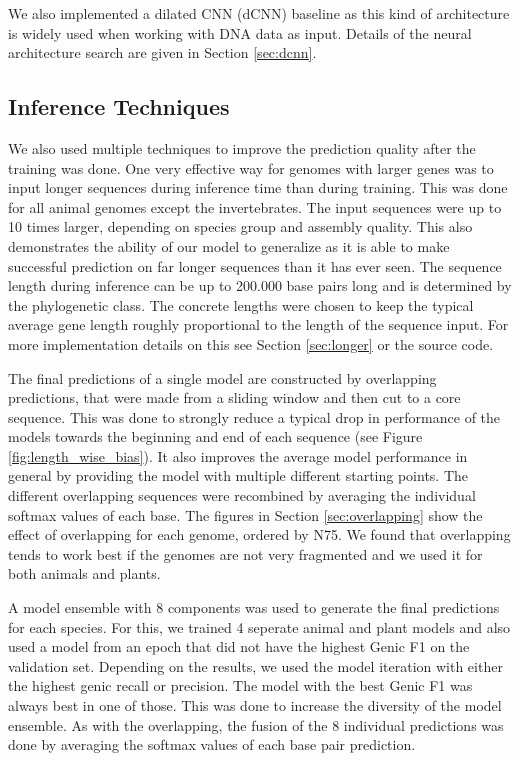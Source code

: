 \documentclass{bioinfo}
\begin{document}
\begin{methods}
We also implemented a dilated CNN (dCNN) baseline as this kind of architecture is widely used when working with DNA data as input. Details of the neural architecture search are given in Section \ref{sec:dcnn}.

\subsection{Inference Techniques}
We also used multiple techniques to improve the prediction quality after the training was done. One very effective way for genomes with larger genes was to input longer sequences during inference time than during training. This was done for all animal genomes except the invertebrates. The input sequences were up to 10 times larger, depending on species group and assembly quality. This also demonstrates the ability of our model to generalize as it is able to make successful prediction on far longer sequences than it has ever seen. The sequence length during inference can be up to 200.000 base pairs long and is determined by the phylogenetic class. The concrete lengths were chosen to keep the typical average gene length roughly proportional to the length of the sequence input. For more implementation details on this see Section \ref{sec:longer} or the source code.
	
The final predictions of a single model are constructed by overlapping predictions, that were made from a sliding window and then cut to a core sequence. This was done to strongly reduce a typical drop in performance of the models towards the beginning and end of each sequence (see Figure \ref{fig:length_wise_bias}). It also improves the average model performance in general by providing the model with multiple different starting points. The different overlapping sequences were recombined by averaging the individual softmax values of each base. The figures in Section \ref{sec:overlapping} show the effect of overlapping for each genome, ordered by N75. We found that overlapping tends to work best if the genomes are not very fragmented and we used it for both animals and plants.

A model ensemble with 8 components was used to generate the final predictions for each species. For this, we trained 4 seperate animal and plant models and also used a model from an epoch that did not have the highest Genic F1 on the validation set. Depending on the results, we used the model iteration with either the highest genic recall or precision. The model with the best Genic F1 was always best in one of those. This was done to increase the diversity of the model ensemble. As with the overlapping, the fusion of the 8 individual predictions was done by averaging the softmax values of each base pair prediction.


\end{methods}
\end{document}
